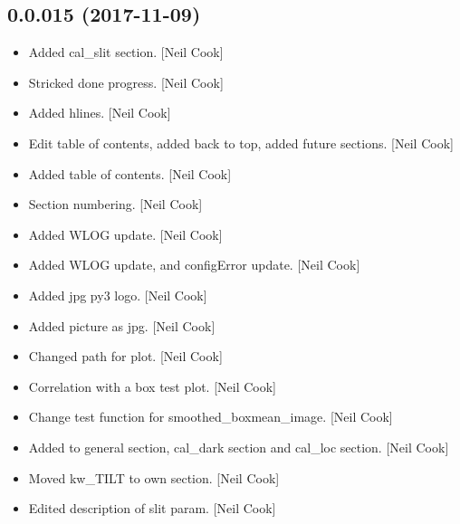 \documentclass[a4paper,10pt,english]{report}
\begin{document}
\subsection{0.0.015 (2017-11-09)}
\label{\detokenize{misc/changelog:id534}}\begin{itemize}
\item {} 
Added cal\_slit section. {[}Neil Cook{]}

\item {} 
Stricked done progress. {[}Neil Cook{]}

\item {} 
Added hlines. {[}Neil Cook{]}

\item {} 
Edit table of contents, added back to top, added future sections.
{[}Neil Cook{]}

\item {} 
Added table of contents. {[}Neil Cook{]}

\item {} 
Section numbering. {[}Neil Cook{]}

\item {} 
Added WLOG update. {[}Neil Cook{]}

\item {} 
Added WLOG update, and configError update. {[}Neil Cook{]}

\item {} 
Added jpg py3 logo. {[}Neil Cook{]}

\item {} 
Added picture as jpg. {[}Neil Cook{]}

\item {} 
Changed path for plot. {[}Neil Cook{]}

\item {} 
Correlation with a box test plot. {[}Neil Cook{]}

\item {} 
Change test function for smoothed\_boxmean\_image. {[}Neil Cook{]}

\item {} 
Added to general section, cal\_dark section and cal\_loc section. {[}Neil
Cook{]}

\item {} 
Moved kw\_TILT to own section. {[}Neil Cook{]}

\item {} 
Edited description of slit param. {[}Neil Cook{]}

\end{itemize}
\end{document}

